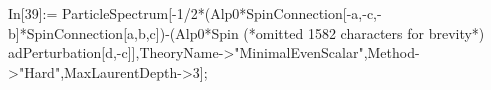 In[39]:= ParticleSpectrum[-1/2*(Alp0*SpinConnection[-a,-c,-b]*SpinConnection[a,b,c])-(Alp0*Spin (*omitted 1582 characters for brevity*) adPerturbation[d,-c]],TheoryName->"MinimalEvenScalar",Method->"Hard",MaxLaurentDepth->3];